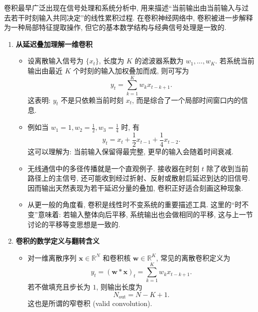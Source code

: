 \documentclass{../nndlcourse}
\begin{document}
卷积最早广泛出现在信号处理和系统分析中, 用来描述“当前输出由当前输入与过去若干时刻输入共同决定”的线性累积过程. 在卷积神经网络中, 卷积被进一步解释为一种局部特征提取操作, 但它的基本数学结构与经典信号处理是一致的.

\begin{enumerate}
    \item \textbf{从延迟叠加理解一维卷积}
    \begin{itemize}
        \item 设离散输入信号为 $\{x_t\}$, 长度为 $K$ 的滤波器系数为 $w_1, \dots, w_K$. 若系统当前输出由最近 $K$ 个时刻的输入加权叠加而成, 则可写为
        \begin{equation*}
            y_t = \sum_{k=1}^{K} w_k x_{t-k+1}.
        \end{equation*}
        这表明: $y_t$ 不是只依赖当前时刻 $x_t$, 而是综合了一个局部时间窗口内的信息.
        \item 例如当 $w_1 = 1, w_2 = \frac{1}{2}, w_3 = \frac{1}{4}$ 时, 有
        \begin{equation*}
            y_t = x_t + \frac{1}{2}x_{t-1} + \frac{1}{4}x_{t-2}.
        \end{equation*}
        这可以理解为: 当前输入保留得最完整, 更早的输入会随着时间衰减.
        \item 无线通信中的多径传播就是一个直观例子. 接收器在时刻 $t$ 除了收到当前路径上的主信号, 还可能收到经过折射、反射或散射后延迟到达的旧信号. 因而输出天然表现为若干延迟分量的叠加, 卷积正好适合刻画这种现象.
        \item 从更一般的角度看, 卷积是线性时不变系统的重要描述工具. 这里的“时不变”意味着: 若输入整体向后平移, 系统输出也会做相同的平移, 这与上一节讨论的平移等变思想是一致的.
    \end{itemize}
    \item \textbf{卷积的数学定义与翻转含义}
    \begin{itemize}
        \item 对一维离散序列 $\boldsymbol{x} \in \mathbb{R}^{N}$ 和卷积核 $\boldsymbol{w} \in \mathbb{R}^{K}$, 常见的离散卷积定义为
        \begin{equation*}
            y_t = {(\boldsymbol{w} * \boldsymbol{x})}_t = \sum_{k=1}^{K} w_k x_{t-k+1}.
        \end{equation*}
        若不做填充且步长为 $1$, 则输出长度为
        \begin{equation*}
            N_{\mathrm{out}} = N - K + 1.
        \end{equation*}
        这也是所谓的窄卷积 (valid convolution).

\end{itemize}
\end{enumerate}
\end{document}
